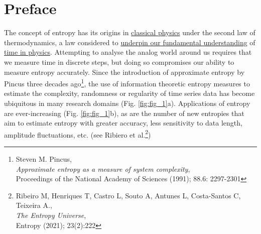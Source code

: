\documentclass[12pt, a4paper, titlepage, openany]{book}
\newcommand\chapterimage[2][]{%
  \AddToShipoutPictureBG*{%
    \AtTextUpperLeft{%
     \hspace*{\textwidth}%
      \llap{%
            \texttt{[image: \#2]}}}}}%
\begin{document}
\chapter*{\vspace{10cm}\textbf{Preface}}
\chapterimage[width=16cm, height=3cm]{Chapter Banner2.png}
\vspace{1cm}
The concept of entropy has its origins in \href{http://www.scholarpedia.org/article/Entropy}{classical physics} under the second law of thermodynamics, a law considered to \href{https://www.penguin.co.uk/books/301539/the-order-of-time/9780141984964.html}{underpin our fundamental understanding} of \href{https://en.wikipedia.org/wiki/Time_in_physics}{time in physics}. Attempting to analyse the analog world around us requires that we measure time in discrete steps, but doing so compromises our ability to measure entropy accurately. Since the introduction of approximate entropy by Pincus three decades ago\footnote{Steven M. Pincus, \\\indent\indent \emph{Approximate entropy as a measure of system complexity},\\\indent\indent Proceedings of the National Academy of Sciences (1991);  88.6: 2297-2301},
the use of information theoretic entropy measures to estimate the complexity, randomness or regularity of time series data has become ubiquitous in many research domains (Fig. \ref{fig:fig_1}a). Applications of entropy are ever-increasing (Fig. \ref{fig:fig_1}b), as are the number of new entropies that aim to estimate entropy with greater accuracy, less sensitivity to data length, amplitude fluctuations, etc. (see Ribiero et al.\footnote{Ribeiro M, Henriques T, Castro L, Souto A, Antunes L, Costa-Santos C, Teixeira A., 
\\\indent\indent \emph{The Entropy Universe}, \\\indent\indent Entropy (2021); 23(2):222})
\end{document}
